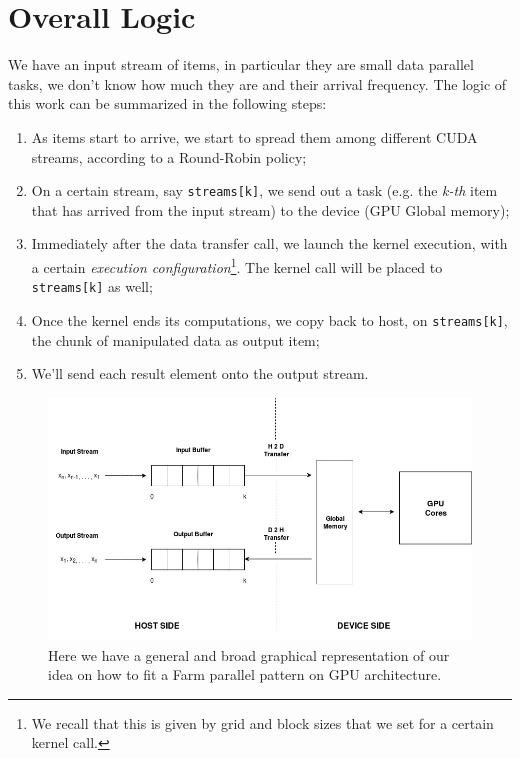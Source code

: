 \section{Overall Logic}
\label{sect:overallLogic}
We have an input stream of items, in particular they are small data parallel tasks, we don't know how much they are and their arrival frequency.
The logic of this work can be summarized in the following steps:
\begin{enumerate}
	\item As items start to arrive, we start to spread them among different CUDA streams, according to a Round-Robin policy;
	\item On a certain stream, say \texttt{streams[k]}, we send out a task (e.g. the \textit{k-th} item that has arrived from the input stream) to the device (GPU Global memory);
	\item Immediately after the data transfer call, we launch the kernel execution, with a certain \textit{execution configuration}\footnote{We recall that this is given by grid and block sizes that we set for a certain kernel call.}. The kernel call will be placed to \texttt{streams[k]} as well;
	\item Once the kernel ends its computations, we copy back to host, on \texttt{streams[k]}, the chunk of manipulated data as output item;
	\item We'll send each result element onto the output stream. 
\end{enumerate}

	\begin{figure}
		\includegraphics[width=\linewidth]{images/H2D.jpg}
		\caption{Here we have a general and broad graphical representation of our idea on how to fit a Farm parallel pattern on GPU architecture.}
		\label{fig:H2D}
	\end{figure}
	
